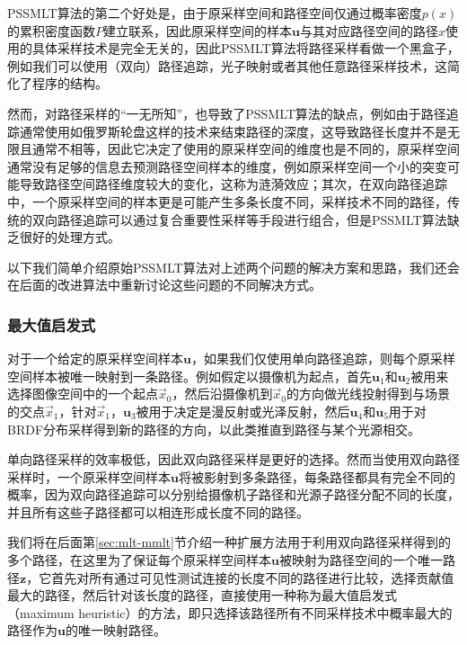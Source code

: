 PSSMLT算法的第二个好处是，由于原采样空间和路径空间仅通过概率密度$p({x})$的累积密度函数$P$建立联系，因此原采样空间的样本$\mathbf{u}$与其对应路径空间的路径${x}$使用的具体采样技术是完全无关的，因此PSSMLT算法将路径采样看做一个黑盒子，例如我们可以使用（双向）路径追踪，光子映射或者其他任意路径采样技术，这简化了程序的结构。

然而，对路径采样的“一无所知”，也导致了PSSMLT算法的缺点，例如由于路径追踪通常使用如俄罗斯轮盘这样的技术来结束路径的深度，这导致路径长度并不是无限且通常不相等，因此它决定了使用的原采样空间的维度也是不同的，原采样空间通常没有足够的信息去预测路径空间样本的维度，例如原采样空间一个小的突变可能导致路径空间路径维度较大的变化，这称为涟漪效应；其次，在双向路径追踪中，一个原采样空间的样本更是可能产生多条长度不同，采样技术不同的路径，传统的双向路径追踪可以通过复合重要性采样等手段进行组合，但是PSSMLT算法缺乏很好的处理方式。

以下我们简单介绍原始PSSMLT算法对上述两个问题的解决方案和思路，我们还会在后面的改进算法中重新讨论这些问题的不同解决方式。




\subsubsection{最大值启发式}\label{sec:mlt-maximum-heuristic}
对于一个给定的原采样空间样本$\mathbf{u}$，如果我们仅使用单向路径追踪，则每个原采样空间样本被唯一映射到一条路径。例如假定以摄像机为起点，首先$\mathbf{u}_1$和$\mathbf{u}_2$被用来选择图像空间中的一个起点$\vec{x}_0$，然后沿摄像机到$\vec{x}_0$的方向做光线投射得到与场景的交点$\vec{x}_1$，针对$\vec{x}_1$，$\mathbf{u}_3$被用于决定是漫反射或光泽反射，然后$\mathbf{u}_4$和$\mathbf{u}_5$用于对BRDF分布采样得到新的路径的方向，以此类推直到路径与某个光源相交。

单向路径采样的效率极低，因此双向路径采样是更好的选择。然而当使用双向路径采样时，一个原采样空间样本$\mathbf{u}$将被影射到多条路径，每条路径都具有完全不同的概率，因为双向路径追踪可以分别给摄像机子路径和光源子路径分配不同的长度，并且所有这些子路径都可以相连形成长度不同的路径。

我们将在后面第\ref{sec:mlt-mmlt}节介绍一种扩展方法用于利用双向路径采样得到的多个路径，在这里为了保证每个原采样空间样本$\mathbf{u}$被映射为路径空间的一个唯一路径$\mathbf{z}$，它首先对所有通过可见性测试连接的长度不同的路径进行比较，选择贡献值最大的路径，然后针对该长度的路径，\cite{a:ASimpleandRobustMutationStrategyfortheMetropolisLightTransportAlgorithm}直接使用一种称为最大值启发式（maximum heuristic）的方法，即只选择该路径所有不同采样技术中概率最大的路径作为$\mathbf{u}$的唯一映射路径。



